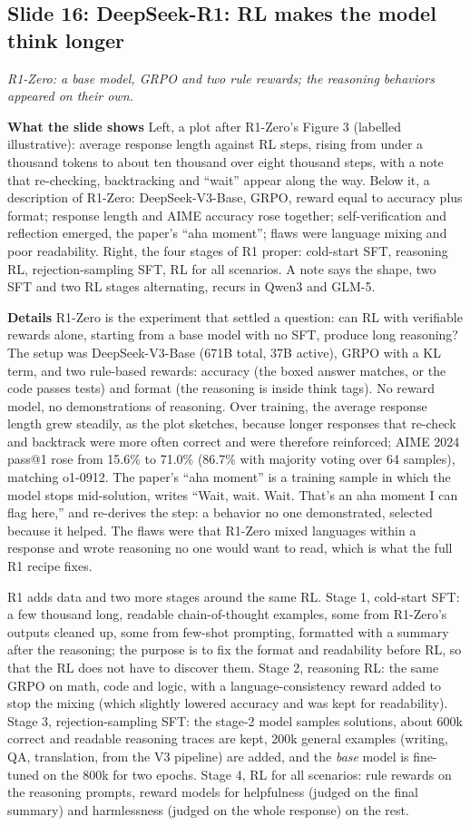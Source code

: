\documentclass[11pt,letterpaper]{article}
\newcommand{\slide}[3]{%
  \subsection[Slide #1: #2]{Slide #1: #2}%
  {\color{muted}\itshape #3\par}\medskip}
\newcommand{\para}[1]{\medskip\noindent\textbf{#1}\quad}
\begin{document}
\slide{16}{DeepSeek-R1: RL makes the model think longer}{R1-Zero: a base model, GRPO and two rule rewards; the reasoning behaviors appeared on their own.}

\para{What the slide shows} Left, a plot after R1-Zero's Figure 3 (labelled illustrative): average response length against RL steps, rising from under a thousand tokens to about ten thousand over eight thousand steps, with a note that re-checking, backtracking and ``wait'' appear along the way. Below it, a description of R1-Zero: DeepSeek-V3-Base, GRPO, reward equal to accuracy plus format; response length and AIME accuracy rose together; self-verification and reflection emerged, the paper's ``aha moment''; flaws were language mixing and poor readability. Right, the four stages of R1 proper: cold-start SFT, reasoning RL, rejection-sampling SFT, RL for all scenarios. A note says the shape, two SFT and two RL stages alternating, recurs in Qwen3 and GLM-5.

\para{Details} R1-Zero is the experiment that settled a question: can RL with verifiable rewards alone, starting from a base model with no SFT, produce long reasoning? The setup was DeepSeek-V3-Base (671B total, 37B active), GRPO with a KL term, and two rule-based rewards: accuracy (the boxed answer matches, or the code passes tests) and format (the reasoning is inside think tags). No reward model, no demonstrations of reasoning. Over training, the average response length grew steadily, as the plot sketches, because longer responses that re-check and backtrack were more often correct and were therefore reinforced; AIME 2024 pass@1 rose from 15.6\% to 71.0\% (86.7\% with majority voting over 64 samples), matching o1-0912. The paper's ``aha moment'' is a training sample in which the model stops mid-solution, writes ``Wait, wait. Wait. That's an aha moment I can flag here,'' and re-derives the step: a behavior no one demonstrated, selected because it helped. The flaws were that R1-Zero mixed languages within a response and wrote reasoning no one would want to read, which is what the full R1 recipe fixes.

R1 adds data and two more stages around the same RL. Stage 1, cold-start SFT: a few thousand long, readable chain-of-thought examples, some from R1-Zero's outputs cleaned up, some from few-shot prompting, formatted with a summary after the reasoning; the purpose is to fix the format and readability before RL, so that the RL does not have to discover them. Stage 2, reasoning RL: the same GRPO on math, code and logic, with a language-consistency reward added to stop the mixing (which slightly lowered accuracy and was kept for readability). Stage 3, rejection-sampling SFT: the stage-2 model samples solutions, about 600k correct and readable reasoning traces are kept, 200k general examples (writing, QA, translation, from the V3 pipeline) are added, and the \emph{base} model is fine-tuned on the 800k for two epochs. Stage 4, RL for all scenarios: rule rewards on the reasoning prompts, reward models for helpfulness (judged on the final summary) and harmlessness (judged on the whole response) on the rest.
\end{document}
